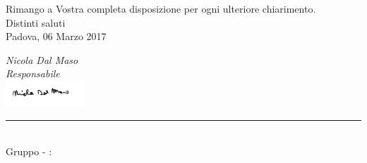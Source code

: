 \begin{titlepage}
\begin{large}
	Rimango a Vostra completa disposizione per ogni ulteriore chiarimento. \\
	Distinti saluti\\
	 
	Padova, 06 Marzo 2017
	\begin{flushright}
		\emph{Nicola Dal Maso} \\ 
		\emph{Responsabile \GroupName{}} \\
		\includegraphics[width=3cm]{../../firme/NDM.png}
 	\end{flushright}
	
	\end{large}
	
	\begin{center}
		\rule{13cm}{0,03cm} \\
		Gruppo \GroupName{} - \email: \GroupEmail{}
	\end{center} 
	
	
\end{titlepage}
  
 \restoregeometry
